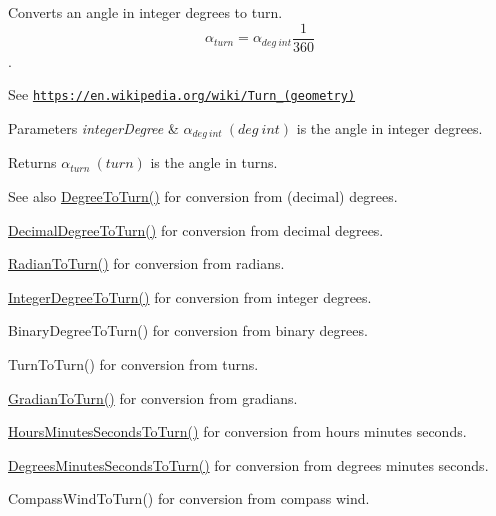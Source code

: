 Converts an angle in integer degrees to turn. \[\alpha_{turn}=\alpha_{deg\ int}\frac{1}{360}\]. 

See \href{https://en.wikipedia.org/wiki/Turn_(geometry)}{\tt https\+://en.\+wikipedia.\+org/wiki/\+Turn\+\_\+(geometry)} 
\begin{DoxyParams}{Parameters}
{\em integer\+Degree} & $\alpha_{deg\ int}\ (deg\ int)$ is the angle in integer degrees. \\
\hline
\end{DoxyParams}
\begin{DoxyReturn}{Returns}
$\alpha_{turn}\ (turn)$ is the angle in turns. 
\end{DoxyReturn}
\begin{DoxySeeAlso}{See also}
\mbox{\hyperlink{group___e_g_x_math-_angle_conversions-_degree_gafb4ce930493a7d6202ede3ee1630ef5d}{Degree\+To\+Turn()}} for conversion from (decimal) degrees. 

\mbox{\hyperlink{group___e_g_x_math-_angle_conversions-_decimal_degree_ga396a13c10acdef5026c12f3217b142c1}{Decimal\+Degree\+To\+Turn()}} for conversion from decimal degrees. 

\mbox{\hyperlink{group___e_g_x_math-_angle_conversions-_radian_ga8492d6d2f6467c619b65e5fb75a9ae04}{Radian\+To\+Turn()}} for conversion from radians. 

\mbox{\hyperlink{group___e_g_x_math-_angle_conversions-_integer_degree_ga06ddbdada5a3978105c855d4aae735ae}{Integer\+Degree\+To\+Turn()}} for conversion from integer degrees. 

Binary\+Degree\+To\+Turn() for conversion from binary degrees. 

Turn\+To\+Turn() for conversion from turns. 

\mbox{\hyperlink{group___e_g_x_math-_angle_conversions-_gradian_ga11b42138910d26474f47c0a2043911c9}{Gradian\+To\+Turn()}} for conversion from gradians. 

\mbox{\hyperlink{group___e_g_x_math-_angle_conversions-_hours_minutes_seconds_ga68050282994968cd6f80a396f6a539ae}{Hours\+Minutes\+Seconds\+To\+Turn()}} for conversion from hours minutes seconds. 

\mbox{\hyperlink{group___e_g_x_math-_angle_conversions-_degrees_minutes_seconds_ga1e6b1b889f6914942b12623934341fc6}{Degrees\+Minutes\+Seconds\+To\+Turn()}} for conversion from degrees minutes seconds. 

Compass\+Wind\+To\+Turn() for conversion from compass wind. 
\end{DoxySeeAlso}
